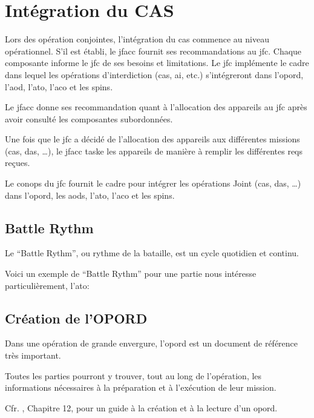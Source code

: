 \section{Intégration du CAS}

Lors des opération conjointes, l'intégration du \gls{cas} commence au niveau opérationnel. S'il est établi, le \gls{jfacc} fournit ses recommandations au \gls{jfc}. Chaque composante informe le \gls{jfc} de ses besoins et limitations. Le \gls{jfc} implémente le cadre dans lequel les opérations d'interdiction (\gls{cas}, \gls{ai}, etc.) s'intégreront dans l'\gls{opord}, l'\gls{aod}, l'\gls{ato}, l'\gls{aco} et les \gls{spins}.

Le \gls{jfacc} donne ses recommandation quant à l'allocation des appareils au \gls{jfc} après avoir consulté les composantes subordonnées.

Une fois que le \gls{jfc} a décidé de l'allocation des appareils aux différentes missions (\gls{cas}, \gls{das}, \ldots{}), le \gls{jfacc} taske les appareils de manière à remplir les différentes \glspl{req} reçues.

Le \gls{conops} du \gls{jfc} fournit le cadre pour intégrer les opérations Joint (\gls{cas}, \gls{das}, \ldots{}) dans l'\gls{opord}, les \glspl{aod}, l'\gls{ato}, l'\gls{aco} et les \gls{spins}.

\begin{minipage}{\linewidth}
	\subsection{Battle Rythm}
	
	Le ``Battle Rythm'', ou rythme de la bataille, est un cycle quotidien et continu.
	
	Voici un exemple de ``Battle Rythm'' pour une partie nous intéresse particulièrement, l'\gls{ato}:
	
\end{minipage}

\subsection{Création de l'OPORD}

Dans une opération de grande envergure, l'\gls{opord} est un document de référence très important.

Toutes les parties pourront y trouver, tout au long de l'opération, les informations nécessaires à la préparation et à l'exécution de leur mission.

Cfr. , Chapitre 12, pour un guide à la création et à la lecture d'un \gls{opord}.



